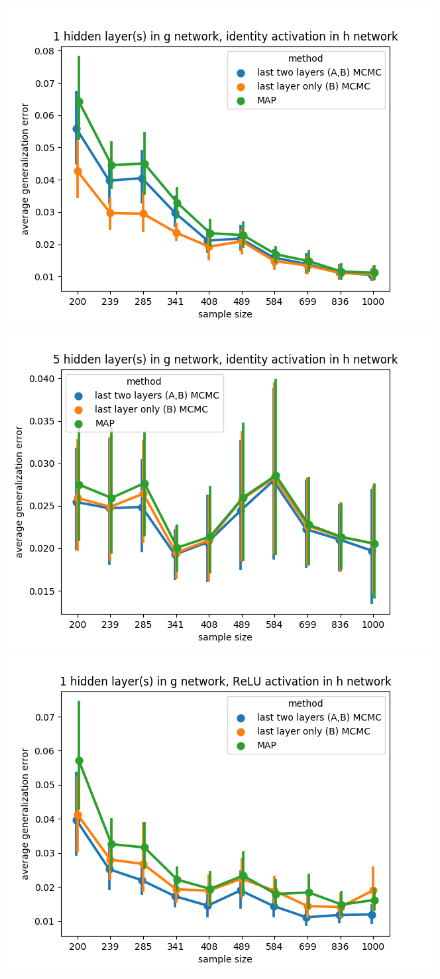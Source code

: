 \documentclass{article} %
\begin{document}
\newpage

\begin{figure}[t!]
	\begin{center}
		\includegraphics[scale=0.35]{taskid0.png}
		\includegraphics[scale=0.35]{taskid1.png}
		\includegraphics[scale=0.35]{taskid2.png}

\end{center}
\end{figure}
\end{document}
